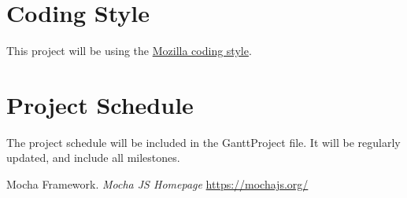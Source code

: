 \documentclass[12pt]{article}
\begin{document}
\section{Coding Style}
This project will be using the \href{https://developer.mozilla.org/en-US/docs/Mozilla/Developer_guide/Coding_Style}{Mozilla coding style}.
\section{Project Schedule}
The project schedule will be included in the GanttProject file. It will be regularly updated, and include all milestones. 



\begin{thebibliography}{9}
Mocha Framework.
\textit{Mocha JS Homepage}
\url{https://mochajs.org/}


 
\end{thebibliography}
\end{document}
